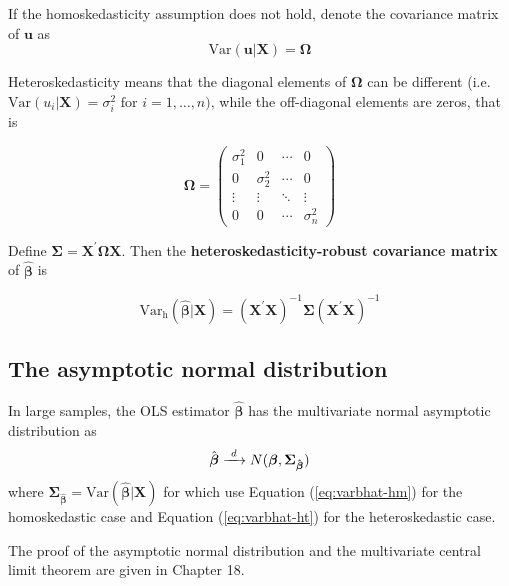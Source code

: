 \documentclass[a4paper,11pt]{article}
\newcommand{\var}{\mathrm{Var}}
\newcommand{\rarrowd}[1]{\xrightarrow{\text{ \textit #1 }}}
\begin{document}
If the homoskedasticity assumption does not hold, denote the
covariance matrix of \(\mathbf{u}\) as
\[ \var(\mathbf{u} | \mathbf{X}) = \mathbf{\Omega} \]

Heteroskedasticity means that the diagonal elements of
\(\mathbf{\Omega}\) can be different (i.e. \(\var(u_i | \mathbf{X}) =
\sigma^2_i \text{ for } i=1, \ldots, n)\), while the off-diagonal
elements are zeros, that is
\begin{LaTeX}
\begin{equation*}
\mathbf{\Omega} =
\begin{pmatrix}
\sigma^2_1 & 0 & \cdots & 0 \\
0 & \sigma^2_2 & \cdots & 0 \\
\vdots & \vdots & \ddots & \vdots \\
0 & 0 & \cdots & \sigma^2_n
\end{pmatrix}
\end{equation*}
\end{LaTeX}

Define \(\mathbf{\Sigma} = \mathbf{X}^{\prime} \mathbf{\Omega}
\mathbf{X}\). Then the \textbf{heteroskedasticity-robust covariance matrix} of
\(\hat{\boldsymbol{\beta}}\) is
\begin{LaTeX}
\begin{equation}
\label{eq:varbhat-ht}
\var_{\mathrm{h}}(\hat{\boldsymbol{\beta}} | \mathbf{X}) = \left(\mathbf{X}^{\prime} \mathbf{X}\right)^{-1} \mathbf{\Sigma} (\mathbf{X}^{\prime} \mathbf{X})^{-1}
\end{equation}
\end{LaTeX}

\subsection{The asymptotic normal distribution}
\label{sec:org72bb120}
In large samples, the OLS estimator \(\hat{\boldsymbol{\beta}}\) has the
multivariate normal asymptotic distribution as
\begin{equation}
\label{eq:normal-bhat-m}
\hat{\boldsymbol{\beta}} \rarrowd{d} N(\boldsymbol{\beta}, \mathbf{\Sigma_{\hat{\boldsymbol{\beta}}}})
\end{equation}
where \(\mathbf{\Sigma_{\hat{\boldsymbol{\beta}}}} =
\var(\hat{\boldsymbol{\beta}} | \mathbf{X})\) for which use
Equation (\ref{eq:varbhat-hm}) for the homoskedastic case and Equation
(\ref{eq:varbhat-ht}) for the heteroskedastic case.

The proof of the asymptotic normal distribution and the multivariate
central limit theorem are given in Chapter 18.
\end{document}
